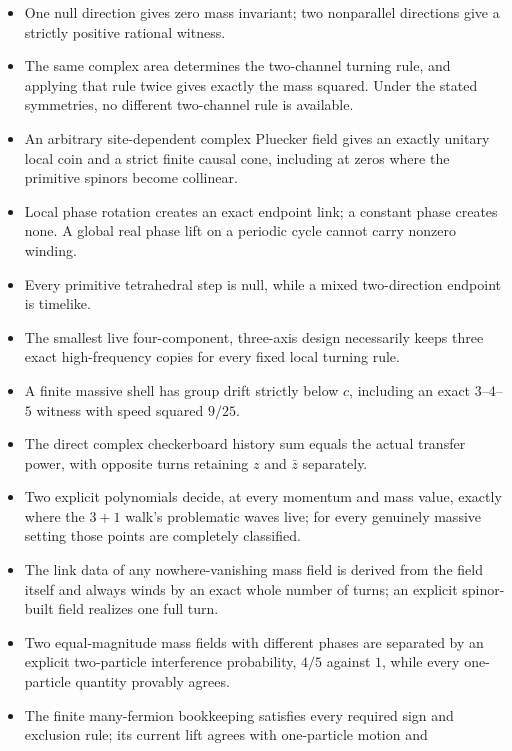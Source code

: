 \documentclass[11pt]{article}
\begin{document}
\begin{itemize}
  \item One null direction gives zero mass invariant; two nonparallel directions
        give a strictly positive rational witness.
  \item The same complex area determines the two-channel turning rule, and
        applying that rule twice gives exactly the mass squared.  Under the
        stated symmetries, no different two-channel rule is available.
  \item An arbitrary site-dependent complex Pluecker field gives an exactly
        unitary local coin and a strict finite causal cone, including at zeros
        where the primitive spinors become collinear.
  \item Local phase rotation creates an exact endpoint link; a constant phase
        creates none.  A global real phase lift on a periodic cycle cannot carry
        nonzero winding.
  \item Every primitive tetrahedral step is null, while a mixed two-direction
        endpoint is timelike.
  \item The smallest live four-component, three-axis design necessarily keeps
        three exact high-frequency copies for every fixed local turning rule.
  \item A finite massive shell has group drift strictly below $c$, including an
        exact $3$--$4$--$5$ witness with speed squared $9/25$.
  \item The direct complex checkerboard history sum equals the actual transfer
        power, with opposite turns retaining $z$ and $\bar z$ separately.
  \item Two explicit polynomials decide, at every momentum and mass value,
        exactly where the $3+1$ walk's problematic waves live; for every
        genuinely massive setting those points are completely classified.
  \item The link data of any nowhere-vanishing mass field is derived from
        the field itself and always winds by an exact whole number of turns;
        an explicit spinor-built field realizes one full turn.
  \item Two equal-magnitude mass fields with different phases are separated
        by an explicit two-particle interference probability, $4/5$ against
        $1$, while every one-particle quantity provably agrees.
  \item The finite many-fermion bookkeeping satisfies every required sign and
        exclusion rule; its current lift agrees with one-particle motion and

\end{itemize}
\end{document}
